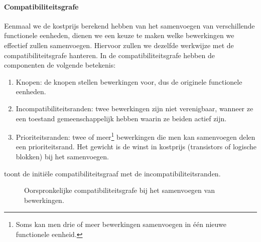 \paragraph{Compatibiliteitsgrafe}
Eenmaal we de kostprijs berekend hebben van het samenvoegen van verschillende functionele eenheden, dienen we een keuze te maken welke bewerkingen we effectief zullen samenvoegen. Hiervoor zullen we dezelfde werkwijze met de compatibiliteitsgrafe hanteren. In de compatibiliteitsgrafe hebben de componenten de volgende betekenis:
\begin{enumerate}
 \item Knopen: de knopen stellen bewerkingen voor, dus de originele functionele eenheden.
 \item Incompatibiliteitsranden: twee bewerkingen zijn niet verenigbaar, wanneer ze een toestand gemeenschappelijk hebben waarin ze beiden actief zijn.
 \item Prioriteitsranden: twee of meer\footnote{Soms kan men drie of meer bewerkingen samenvoegen in \'e\'en nieuwe functionele eenheid.} bewerkingen die men kan samenvoegen delen een prioriteitsrand. Het gewicht is de winst in kostprijs (transistors of logische blokken) bij het samenvoegen.
\end{enumerate}
 toont de initi\"ele compatibiliteitsgraaf met de incompatibiliteitsranden.
\begin{figure}[hbt]
\centering
{}
\caption{Oorspronkelijke compatibiliteitsgrafe bij het samenvoegen van bewerkingen.}
\end{figure}
